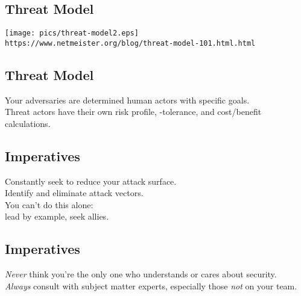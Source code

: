 \documentclass[xga]{xdvislides}
\begin{document}
\subsection{Threat Model}
\vspace*{\fill}
\begin{center}
	\texttt{[image: pics/threat-model2.eps]} \\
\vspace{.2in}
\small
	\verb+https://www.netmeister.org/blog/threat-model-101.html.html+
\end{center}
\Normalsize
\vspace*{\fill}

\subsection{Threat Model}
\vspace*{\fill}
\Huge
\begin{center}
Your adversaries are determined human actors with
specific goals. \\
\addvspace{.5in}
Threat actors have their own risk profile, -tolerance, and cost/benefit calculations.
\end{center}
\Normalsize
\vspace*{\fill}


\subsection{Imperatives}
\vspace*{\fill}
\Huge
\begin{center}
Constantly seek to reduce your attack surface. \\
Identify and eliminate attack vectors.\\

\addvspace{.5in}
You can't do this alone:\\
lead by example, seek allies.
\end{center}
\Normalsize
\vspace*{\fill}

\subsection{Imperatives}
\vspace*{\fill}
\Huge
\begin{center}
{\em Never} think you're the only one who understands
or cares about security. \\

\addvspace{.5in}
{\em Always} consult with subject matter experts,
especially those {\em not} on your team.
\end{center}
\Normalsize
\vspace*{\fill}
\end{document}
